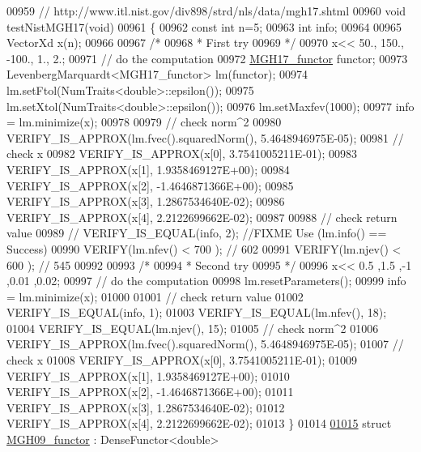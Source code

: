 \begin{DoxyCode}
00959 \textcolor{comment}{// http://www.itl.nist.gov/div898/strd/nls/data/mgh17.shtml}
00960 \textcolor{keywordtype}{void} testNistMGH17(\textcolor{keywordtype}{void})
00961 \{
00962   \textcolor{keyword}{const} \textcolor{keywordtype}{int} n=5;
00963   \textcolor{keywordtype}{int} info;
00964 
00965   VectorXd x(n);
00966 
00967   \textcolor{comment}{/*}
00968 \textcolor{comment}{   * First try}
00969 \textcolor{comment}{   */}
00970   x<< 50., 150., -100., 1., 2.;
00971   \textcolor{comment}{// do the computation}
00972   \hyperlink{struct_m_g_h17__functor}{MGH17\_functor} functor;
00973   LevenbergMarquardt<MGH17\_functor> lm(functor);
00974   lm.setFtol(NumTraits<double>::epsilon());
00975   lm.setXtol(NumTraits<double>::epsilon());
00976   lm.setMaxfev(1000);
00977   info = lm.minimize(x);
00978 
00979   \textcolor{comment}{// check norm^2}
00980   VERIFY\_IS\_APPROX(lm.fvec().squaredNorm(), 5.4648946975E-05);
00981   \textcolor{comment}{// check x}
00982   VERIFY\_IS\_APPROX(x[0], 3.7541005211E-01);
00983   VERIFY\_IS\_APPROX(x[1], 1.9358469127E+00);
00984   VERIFY\_IS\_APPROX(x[2], -1.4646871366E+00);
00985   VERIFY\_IS\_APPROX(x[3], 1.2867534640E-02);
00986   VERIFY\_IS\_APPROX(x[4], 2.2122699662E-02);
00987   
00988     \textcolor{comment}{// check return value}
00989 \textcolor{comment}{//   VERIFY\_IS\_EQUAL(info, 2);  //FIXME Use (lm.info() == Success)}
00990   VERIFY(lm.nfev() < 700 ); \textcolor{comment}{// 602}
00991   VERIFY(lm.njev() < 600 ); \textcolor{comment}{// 545}
00992 
00993   \textcolor{comment}{/*}
00994 \textcolor{comment}{   * Second try}
00995 \textcolor{comment}{   */}
00996   x<< 0.5  ,1.5  ,-1   ,0.01 ,0.02;
00997   \textcolor{comment}{// do the computation}
00998   lm.resetParameters();
00999   info = lm.minimize(x);
01000 
01001   \textcolor{comment}{// check return value}
01002   VERIFY\_IS\_EQUAL(info, 1);
01003   VERIFY\_IS\_EQUAL(lm.nfev(), 18);
01004   VERIFY\_IS\_EQUAL(lm.njev(), 15);
01005   \textcolor{comment}{// check norm^2}
01006   VERIFY\_IS\_APPROX(lm.fvec().squaredNorm(), 5.4648946975E-05);
01007   \textcolor{comment}{// check x}
01008   VERIFY\_IS\_APPROX(x[0], 3.7541005211E-01);
01009   VERIFY\_IS\_APPROX(x[1], 1.9358469127E+00);
01010   VERIFY\_IS\_APPROX(x[2], -1.4646871366E+00);
01011   VERIFY\_IS\_APPROX(x[3], 1.2867534640E-02);
01012   VERIFY\_IS\_APPROX(x[4], 2.2122699662E-02);
01013 \}
01014 
\hyperlink{struct_m_g_h09__functor}{01015} \textcolor{keyword}{struct }\hyperlink{struct_m_g_h09__functor}{MGH09\_functor} : DenseFunctor<double>

\end{DoxyCode}
